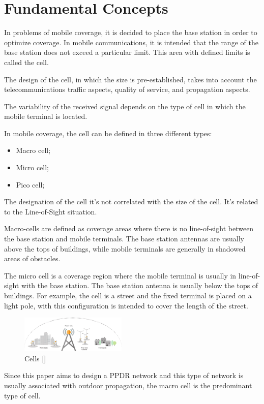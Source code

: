 \documentclass[letterpaper, 10 pt, conference]{ieeeconf}  %
\begin{document}
\section{Fundamental Concepts}
In problems of mobile coverage, it is decided to place the base station in order to optimize coverage. In mobile communications, it is intended that the range of the base station does not exceed a particular limit. This area with defined limits is called the cell.\par\noindent 
The design of the cell, in which the size is pre-established, takes into account the
telecommunications traffic aspects, quality of service, and propagation aspects.\par\noindent
The variability of the received signal depends on the type of cell in which the mobile terminal is located.\par\noindent
In mobile coverage, the cell can be defined in three different types:
\begin{itemize}
    \item Macro cell;
    \item Micro cell;
    \item Pico cell;
\end{itemize}
The designation of the cell it's not correlated with the size of the cell. It's related to the Line-of-Sight situation.\par\noindent
Macro-cells are defined as coverage areas where there is no line-of-sight between the base station and mobile terminals. The base station antennas are usually above the tops of buildings, while mobile terminals are generally in shadowed areas of obstacles.\par\noindent 
The micro cell is a coverage region where the mobile terminal is usually in line-of-sight with the base station. The base station antenna is usually below the tops of buildings. For example, the cell is a street and the fixed terminal is placed on a light pole, with this configuration is intended to cover the length of the street.
\begin{figure}[h]
    \centering
    \includegraphics[width=0.45\textwidth]{celulas.png}
    \caption{Cells []}
    \label{fig:celulas}
\end{figure}
\FloatBarrier
Since this paper aims to design a PPDR network and this type of network is usually associated with outdoor propagation, the macro cell is the predominant type of cell. 
\end{document}

